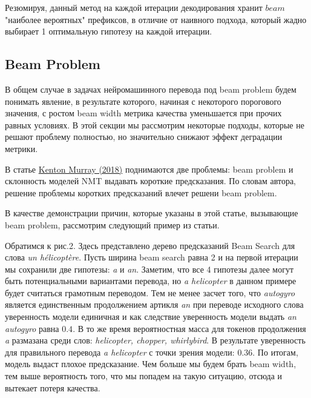 \documentclass[a4paper,12pt]{article} %
\newcommand{\bibref}[3]{\hyperlink{#1}{#2 (#3)}} %
\begin{document}
	Резюмируя, данный метод на каждой итерации декодирования хранит $beam$ "наиболее вероятных" префиксов, в отличие от наивного подхода, который жадно выбирает 1 оптимальную гипотезу на каждой итерации.
	
	\subsection{Beam Problem}
	
	В общем случае в задачах нейромашинного перевода под beam problem будем понимать явление, в результате которого, начиная с некоторого порогового значения, с ростом beam width метрика качества уменьшается при прочих равных условиях. В этой секции мы рассмотрим некоторые подходы, которые не решают проблему полностью, но значительно снижают эффект деградации метрики.
	
	В статье \bibref{corr_len_bias}{Kenton Murray}{2018} поднимаются две проблемы: beam problem и склонность моделей NMT выдавать короткие предсказания. По словам автора, решение проблемы коротких предсказаний влечет решени beam problem.
	
	В качестве демонстрации причин, которые указаны в этой статье, вызывающие beam problem, рассмотрим следующий пример из статьи.
	
	Обратимся к рис.2. Здесь представлено дерево предсказаний Beam Search для слова \textit{un hélicoptère}. Пусть ширина beam search равна 2 и на первой итерации мы сохранили две гипотезы: \textit{a} и \textit{an}. Заметим, что все 4 гипотезы далее могут быть потенциальными вариантами перевода, но \textit{a helicopter} в данном примере будет считаться грамотным переводом. Тем не менее засчет того, что \textit{autogyro} является единственным продолжением артикля \textit{an} при переводе исходного слова уверенность модели единичная и как следствие уверенность модели выдать \textit{an autogyro} равна $0.4$. В то же время вероятностная масса для токенов продолжения \textit{a} размазана среди слов: \textit{helicopter, chopper, whirlybird}. В результате уверенность для правильного перевода \textit{a helicopter} с точки зрения модели: $0.36$. По итогам, модель выдаст плохое предсказание. Чем больше мы будем брать beam width, тем выше вероятность того, что мы попадем на такую ситуацию, отсюда и вытекает потеря качества.
	
	\begin{figure}[t]
	\end{figure}
	
\end{document}
